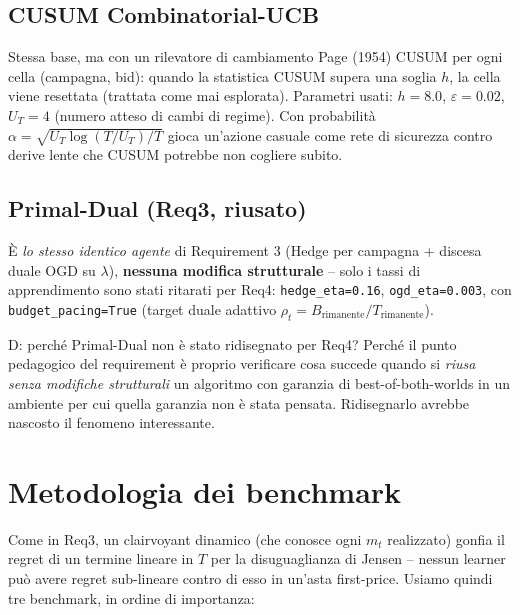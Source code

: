 \documentclass[11pt]{article}
\begin{document}
\subsection{CUSUM Combinatorial-UCB}
Stessa base, ma con un rilevatore di cambiamento Page (1954) CUSUM per ogni cella (campagna, bid): quando la statistica CUSUM supera una soglia $h$, la cella viene resettata (trattata come mai esplorata). Parametri usati: $h=8.0$, $\varepsilon=0.02$, $U_T=4$ (numero atteso di cambi di regime). Con probabilità $\alpha=\sqrt{U_T\log(T/U_T)/T}$ gioca un'azione casuale come rete di sicurezza contro derive lente che CUSUM potrebbe non cogliere subito.

\subsection{Primal-Dual (Req3, riusato)}
\`E \emph{lo stesso identico agente} di Requirement 3 (Hedge per campagna + discesa duale OGD su $\lambda$), \textbf{nessuna modifica strutturale} -- solo i tassi di apprendimento sono stati ritarati per Req4: \texttt{hedge\_eta=0.16}, \texttt{ogd\_eta=0.003}, con \texttt{budget\_pacing=True} (target duale adattivo $\rho_t = B_{\text{rimanente}}/T_{\text{rimanente}}$).

\begin{qabox}{D: perché Primal-Dual non è stato ridisegnato per Req4?}
Perché il punto pedagogico del requirement è proprio verificare cosa succede quando si \emph{riusa senza modifiche strutturali} un algoritmo con garanzia di best-of-both-worlds in un ambiente per cui quella garanzia non è stata pensata. Ridisegnarlo avrebbe nascosto il fenomeno interessante.
\end{qabox}

\section{Metodologia dei benchmark}

Come in Req3, un clairvoyant dinamico (che conosce ogni $m_t$ realizzato) gonfia il regret di un termine lineare in $T$ per la disuguaglianza di Jensen -- nessun learner può avere regret sub-lineare contro di esso in un'asta first-price. Usiamo quindi tre benchmark, in ordine di importanza:
\end{document}
